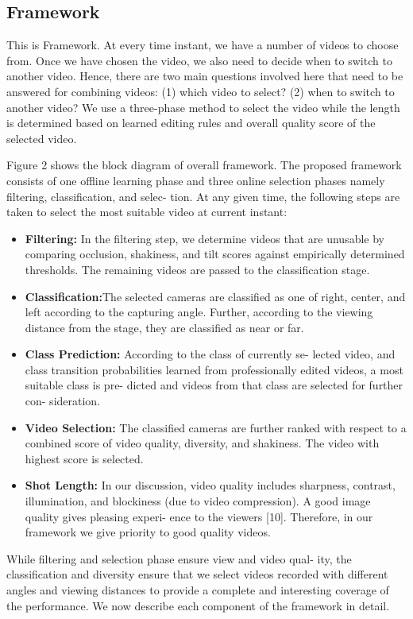\documentclass{sig-alternate-05-2015}
\begin{document}
\subsection{Framework}
This is Framework.
At every time instant, we have a number of videos to choose
from. Once we have chosen the video, we also need to decide when
to switch to another video. Hence, there are two main questions
involved here that need to be answered for combining videos: (1)
which video to select? (2) when to switch to another video? We
use a three-phase method to select the video while the length is
determined based on learned editing rules and overall quality score
of the selected video.

Figure 2 shows the block diagram of overall framework. The
proposed framework consists of one offline learning phase and three online selection phases namely filtering, classification, and selec-
tion. At any given time, the following steps are taken to select the
most suitable video at current instant:\\
\begin{itemize}
\item \textbf{Filtering:} In the filtering step, we determine videos that are
unusable by comparing occlusion, shakiness, and tilt scores
against empirically determined thresholds. The remaining
videos are passed to the classification stage.
\item \textbf{Classification:}The selected cameras are classified as one
of right, center, and left according to the capturing angle.
Further, according to the viewing distance from the stage,
they are classified as near or far.
\item \textbf{Class Prediction:} According to the class of currently se-
lected video, and class transition probabilities learned from
professionally edited videos, a most suitable class is pre-
dicted and videos from that class are selected for further con-
sideration.
\item \textbf{Video Selection:} The classified cameras are further ranked
with respect to a combined score of video quality, diversity,
and shakiness. The video with highest score is selected.
\item \textbf{Shot Length:} In our discussion, video quality includes
sharpness, contrast, illumination, and blockiness (due to video
compression). A good image quality gives pleasing experi-
ence to the viewers [10]. Therefore, in our framework we
give priority to good quality videos.
\end{itemize}
While filtering and selection phase ensure view and video qual-
ity, the classification and diversity ensure that we select videos
recorded with different angles and viewing distances to provide a
complete and interesting coverage of the performance. We now
describe each component of the framework in detail.
\end{document}
